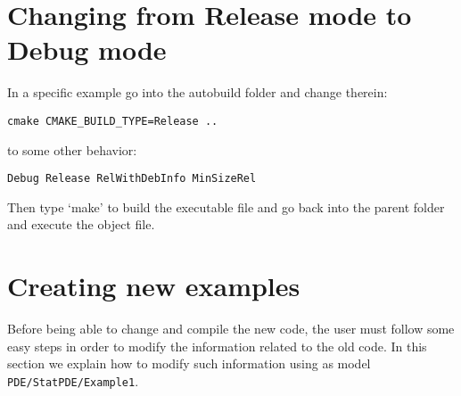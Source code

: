 \section{Changing from Release mode to Debug mode}
\label{sec_release_debug}
In a specific example go into the autobuild folder 
and change therein:
\begin{lstlisting}
cmake CMAKE_BUILD_TYPE=Release ..
\end{lstlisting}
to some other behavior:
\begin{lstlisting}
Debug Release RelWithDebInfo MinSizeRel
\end{lstlisting}
Then type `make' to build the executable file and go back 
into the parent folder and execute the object file.



\section{Creating new examples}
\label{getting_started}
Before being able to change and compile the new code, the user must 
follow some easy steps in order to modify the information related to the old code. In 
this section we explain how to modify such information using as model 
\texttt{PDE/StatPDE/Example1}.


